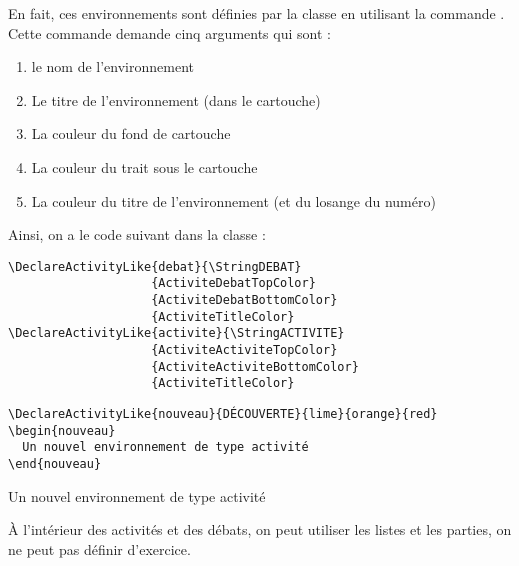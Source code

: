 \documentclass[nocrop]{sesamanuel}
\begin{document}
En fait, ces environnements sont définies par la classe en utilisant
la commande . Cette commande demande cinq
arguments qui sont :
%
\begin{enumerate}
\item le nom de l'environnement
\item Le titre de l'environnement (dans le cartouche)
\item La couleur du fond de cartouche
\item La couleur du trait sous le cartouche
\item La couleur du titre de l'environnement (et du losange du numéro)
\end{enumerate}
Ainsi, on a le code suivant dans la classe :
\begin{verbatim}
\DeclareActivityLike{debat}{\StringDEBAT}
                    {ActiviteDebatTopColor}
                    {ActiviteDebatBottomColor}
                    {ActiviteTitleColor}
\DeclareActivityLike{activite}{\StringACTIVITE}
                    {ActiviteActiviteTopColor}
                    {ActiviteActiviteBottomColor}
                    {ActiviteTitleColor}
\end{verbatim}
\begin{methode*1}
 
\exercice \begin{code}
\begin{verbatim}
\DeclareActivityLike{nouveau}{DÉCOUVERTE}{lime}{orange}{red}
\begin{nouveau}
  Un nouvel environnement de type activité
\end{nouveau}
\end{verbatim}
\end{code}

\correction \begin{result}
             
            \end{result}

\begin{nouveau}
  Un nouvel environnement de type activité
\end{nouveau}

\end{methode*1}

À l'intérieur des activités et des débats, on peut utiliser les listes et
les parties, on ne peut pas définir d'exercice.
\end{document}

